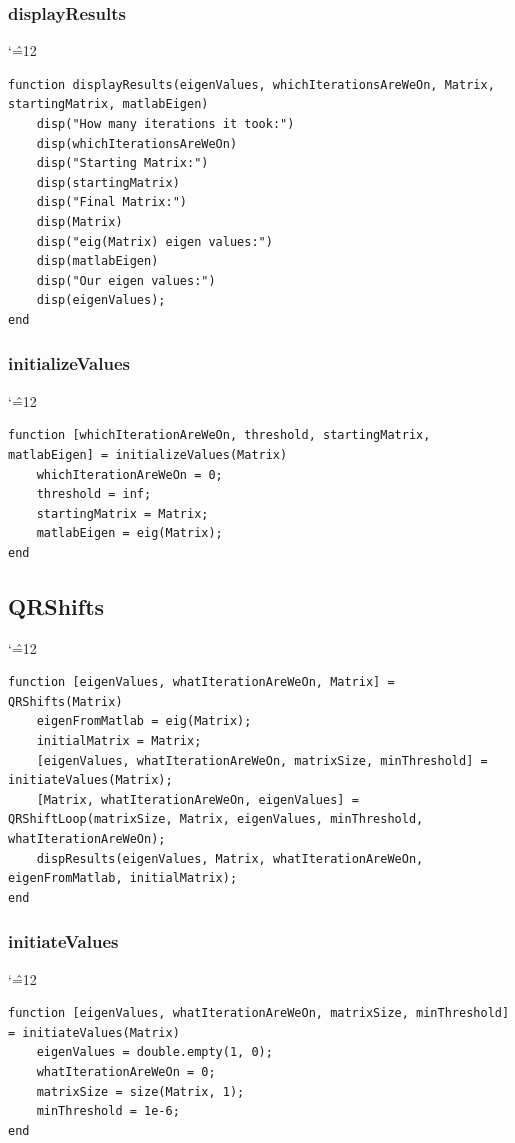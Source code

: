 \documentclass[12pt]{report}
\newenvironment{simplechar}{%
   \catcode`\^=12
}{}
\begin{document}
\newpage
\subsubsection{displayResults}
\begin{simplechar}
\begin{lstlisting}
function displayResults(eigenValues, whichIterationsAreWeOn, Matrix, startingMatrix, matlabEigen)
    disp("How many iterations it took:")
    disp(whichIterationsAreWeOn)
    disp("Starting Matrix:")
    disp(startingMatrix)
    disp("Final Matrix:")
    disp(Matrix)
    disp("eig(Matrix) eigen values:")
    disp(matlabEigen)
    disp("Our eigen values:")
    disp(eigenValues);
end
\end{lstlisting}
\end{simplechar}

\subsubsection{initializeValues}
\begin{simplechar}
\begin{lstlisting}
function [whichIterationAreWeOn, threshold, startingMatrix, matlabEigen] = initializeValues(Matrix)
    whichIterationAreWeOn = 0;
    threshold = inf;
    startingMatrix = Matrix;
    matlabEigen = eig(Matrix);
end
\end{lstlisting}
\end{simplechar}

\newpage
\subsection{QRShifts}
\begin{simplechar}
\begin{lstlisting}
function [eigenValues, whatIterationAreWeOn, Matrix] = QRShifts(Matrix)
    eigenFromMatlab = eig(Matrix);
    initialMatrix = Matrix;
    [eigenValues, whatIterationAreWeOn, matrixSize, minThreshold] = initiateValues(Matrix);
    [Matrix, whatIterationAreWeOn, eigenValues] = QRShiftLoop(matrixSize, Matrix, eigenValues, minThreshold, whatIterationAreWeOn);
    dispResults(eigenValues, Matrix, whatIterationAreWeOn, eigenFromMatlab, initialMatrix);
end
\end{lstlisting}
\end{simplechar}

\subsubsection{initiateValues}
\begin{simplechar}
\begin{lstlisting}
function [eigenValues, whatIterationAreWeOn, matrixSize, minThreshold] = initiateValues(Matrix)
    eigenValues = double.empty(1, 0);
    whatIterationAreWeOn = 0;
    matrixSize = size(Matrix, 1);
    minThreshold = 1e-6;
end

\end{lstlisting}
\end{simplechar}
\end{document}
